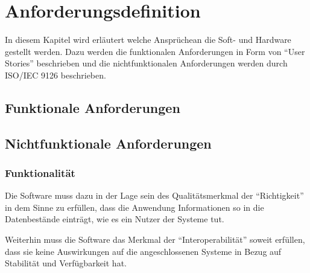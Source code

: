 \chapter{Anforderungsdefinition} %
\label{sec:Anforderungen}
\vspace{-3cm}
\begin{flushleft}
In diesem Kapitel wird erläutert welche Ansprüchean die Soft- und Hardware gestellt werden.
Dazu werden die funktionalen Anforderungen in Form von ``User Stories'' beschrieben und die nichtfunktionalen Anforderungen werden durch ISO/IEC 9126 beschrieben.


\section{Funktionale Anforderungen} %
\label{sec:Funktionale Anforderungen}



\newpage
\section{Nichtfunktionale Anforderungen} %
\label{sec:Nichtfunktionale Anforderungen}

\subsection{Funktionalität} %
\label{sub:Funktionalitaet}

Die Software muss dazu in der Lage sein des Qualitätsmerkmal der ``Richtigkeit'' in dem Sinne zu erfüllen, dass die Anwendung Informationen so in 
die Datenbestände einträgt, wie es ein Nutzer der Systeme tut.

Weiterhin muss die Software das Merkmal der ``Interoperabilität'' soweit erfüllen, dass sie keine Auswirkungen auf die angeschlossenen Systeme in Bezug auf 
Stabilität und Verfügbarkeit hat. 


\end{flushleft}
